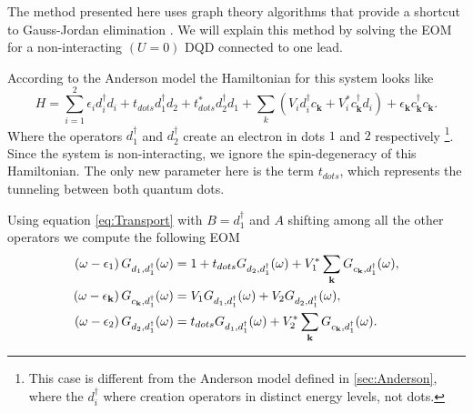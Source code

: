 The method presented here uses graph theory algorithms that provide a shortcut to Gauss-Jordan elimination \cite{spielman10}. We will explain this method by solving  the EOM for a non-interacting $(U=0)$ DQD connected to one lead. 

According to the Anderson model the Hamiltonian for this system looks like 
\begin{equation}
    H=\sum_{i=1}^2\epsilon_{i}d_{i}^{\dagger}d_{i}+ t_{dots}d_{1}^{\dagger}d_{2}+t_{dots}^*d_{2}^{\dagger}d_{1}+\sum_{k}\left(V_{i}d_{i}^{\dagger}c_{\mathbf{k}}+V_{i}^{*}c_{\mathbf{k}}^{\dagger}d_{i}\right) + \epsilon_{\mathbf{k}}c_{\mathbf{k}}^{\dagger}c_{\mathbf{k}}.
    \label{eq:HDQD}
\end{equation} 
\noindent Where the operators $d^\dagger_1$ and $d^\dagger_2$ create an electron in dots $1$ and $2$ respectively \footnote{This case is different from the Anderson model defined in \ref{sec:Anderson}, where the $d^\dagger_i$ where creation operators in distinct energy levels, not dots.}. Since the system is non-interacting, we ignore the spin-degeneracy of this Hamiltonian.   The only new parameter here is the term $t_{dots}$, which represents the tunneling between both quantum dots. 

 Using equation \eqref{eq:Transport} with $B = d_1^\dagger$ and $A$ shifting among all the other operators we compute the following  EOM
\begin{align}
     \left(\omega-\epsilon_{1}\right)G_{d_{1},d_{1}^{\dagger}}(\omega)&=1+t_{dots}G_{d_{2},d_{1}^{\dagger}}(\omega)+V_{1}^{*}\sum_{\mathbf{k}}G_{c_{\mathbf{k}},d_{1}^{\dagger}}(\omega), \label{eq:green1}  \\
     \left(\omega-\epsilon_{\mathbf{k}}\right)G_{c_{\mathbf{k}},d_{1}^{\dagger}}(\omega) &= V_{1}G_{d_{1},d_{1}^{\dagger}}(\omega)+V_{2}G_{d_{2},d_{1}^{\dagger}}(\omega), \label{eq:green2} \\
     \left(\omega-\epsilon_{2}\right)G_{d_{2},d_{1}^{\dagger}}(\omega)&= t_{dots}G_{d_{1},d_{1}^{\dagger}}(\omega)+V_{2}^{*}\sum_{\mathbf{k}}G_{c_{\mathbf{k}},d_{1}^{\dagger}}(\omega). \label{eq:green3} 
\end{align}


